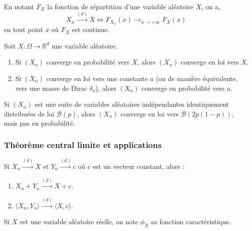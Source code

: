 
	\begin{theorem}
		En notant $F_X$ la fonction de répartition d'une variable aléatoire $X$, on a,
		\[ X_n \overset{(d)}{\longrightarrow} X \iff F_{X_n}(x) \longrightarrow_{n \rightarrow +\infty} F_X(x) \]
		en tout point $x$ où $F_X$ est continue.
	\end{theorem}

	\begin{theorem}
		Soit $X : \Omega \rightarrow \mathbb{R}^d$ une variable aléatoire.
		\begin{enumerate}[label=(\roman*)]
			\item Si $(X_n)$ converge en probabilité vers $X$, alors $(X_n)$ converge en loi vers $X$.
			\item Si $(X_n)$ converge en loi vers une constante $a$ (ou de manière équivalente, vers une masse de Dirac $\delta_a$), alors $(X_n)$ converge en probabilité vers $a$.
		\end{enumerate}
	\end{theorem}

	\reference[HAU]{362}

	\begin{cexample}
		Si $(X_n)$ est une suite de variables aléatoires indépendantes identiquement distribuées de loi $\mathcal{B}(p)$, alors $(X_n)$ converge en loi vers $\mathcal{B}(2p(1-p))$, mais pas en probabilité.
	\end{cexample}

	\subsubsection{Théorème central limite et applications}

	\reference[G-K]{305}

	\begin{theorem}[Slutsky]
		Si $X_n \overset{(d)}{\longrightarrow} X$ et $Y_n \overset{(d)}{\longrightarrow} c$ où $c$ est un vecteur constant, alors :
		\begin{enumerate}[label=(\roman*)]
			\item $X_n + Y_n \overset{(d)}{\longrightarrow} X + c$.
			\item $\langle X_n, Y_n \rangle \overset{(d)}{\longrightarrow} \langle X, c \rangle$.
		\end{enumerate}
	\end{theorem}

	\begin{notation}
		Si $X$ est une variable aléatoire réelle, on note $\phi_X$ sa fonction caractéristique.
	\end{notation}

